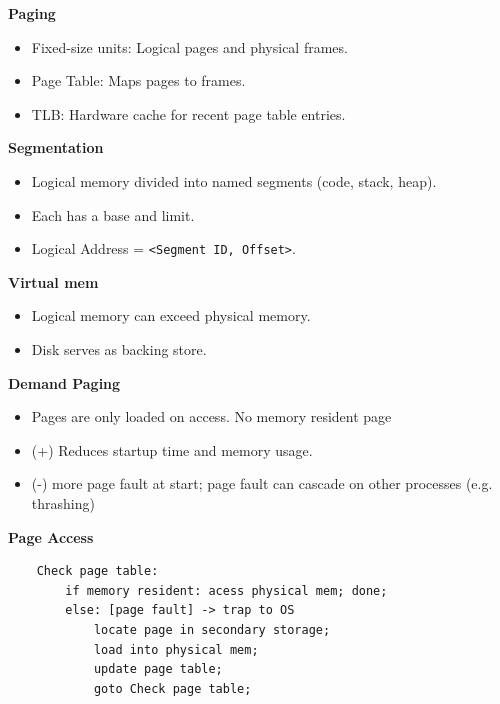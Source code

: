 \documentclass[8pt,twocolumn]{article}
\begin{document}
\vspace{-0.6em}
\textbf{Paging}
\vspace{-0.6em}
\begin{itemize}
    \setlength{\itemsep}{0pt} %
    \setlength{\parskip}{0pt}
  \item Fixed-size units: Logical pages and physical frames.
  \item Page Table: Maps pages to frames.
  \item TLB: Hardware cache for recent page table entries.
\end{itemize}
\vspace{-0.6em}
\textbf{Segmentation}
\vspace{-0.6em}
\begin{itemize}
    \setlength{\itemsep}{0pt} %
    \setlength{\parskip}{0pt}
  \item Logical memory divided into named segments (code, stack, heap).
  \item Each has a base and limit.
  \item Logical Address = \texttt{<Segment ID, Offset>}.
\end{itemize}
\vspace{-0.6em}
\textbf{Virtual mem}
\vspace{-0.6em}
\begin{itemize}
    \setlength{\itemsep}{0pt} %
    \setlength{\parskip}{0pt}
  \item Logical memory can exceed physical memory.
  \item Disk serves as backing store.
\end{itemize}
\vspace{-0.6em}
\textbf{Demand Paging}
\vspace{-0.6em}
\begin{itemize}
    \setlength{\itemsep}{0pt} %
    \setlength{\parskip}{0pt}
  \item Pages are only loaded on access. No memory resident page 
  \item (+) Reduces startup time and memory usage.
  \item (-) more page fault at start; page fault can cascade on other processes (e.g. thrashing)
\end{itemize}
\vspace{-0.6em}
\textbf{Page Access}
\vspace{-0.6em}
\begin{lstlisting}
    Check page table:
        if memory resident: acess physical mem; done;
        else: [page fault] -> trap to OS
            locate page in secondary storage;
            load into physical mem;
            update page table;
            goto Check page table;
\end{lstlisting}
\end{document}
